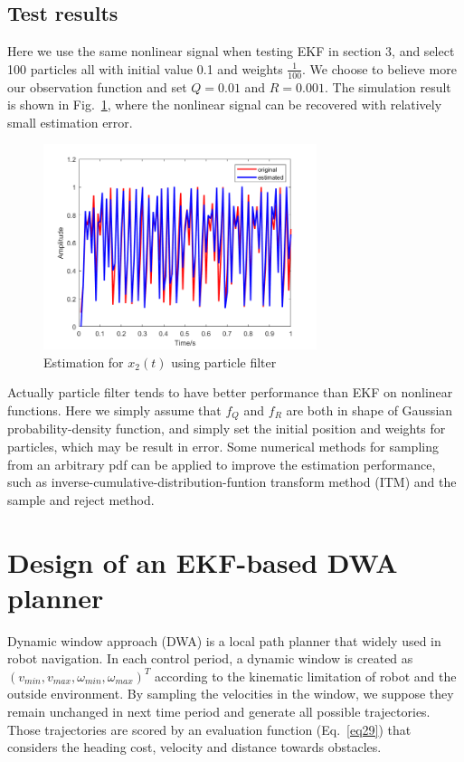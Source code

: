 \documentclass[conference]{IEEEtran}
\begin{document}
	
	\subsection{Test results}
	
	Here we use the same nonlinear signal when testing EKF in section 3, and select 100 particles all with initial value 0.1 and weights $\frac{1}{100}$. We choose to believe more our observation function and set $Q=0.01$ and $R=0.001$. The simulation result is shown in Fig.~\ref{fig5}, where the nonlinear signal can be recovered with relatively small estimation error.
	
	\begin{figure}[H]
		\centering
		\includegraphics[width=8cm]{fig8.png}
		\caption{Estimation for $x_{2}(t)$ using particle filter}
		\label{fig5}
	\end{figure}

	Actually particle filter tends to have better performance than EKF on nonlinear functions. Here we simply assume that $f_{Q}$ and $f_{R}$ are both in shape of Gaussian probability-density function, and simply set the initial position and weights for particles, which may be result in error. Some numerical methods for sampling from an arbitrary pdf can be applied to improve the estimation performance, such as inverse-cumulative-distribution-funtion transform method (ITM) and the sample and reject method. 
	
	\section{Design of an EKF-based DWA planner}
	
	Dynamic window approach (DWA) is a local path planner that widely used in robot navigation. In each control period, a dynamic window is created as $(v_{min}, v_{max},\omega_{min}, \omega_{max})^{T}$ according to the kinematic limitation of robot and the outside environment. By sampling the velocities in the window, we suppose they remain unchanged in next time period and generate all possible trajectories. Those trajectories are scored by an evaluation function (Eq.~\ref{eq29}) that considers the heading cost, velocity and distance towards obstacles. 
	
\end{document}
